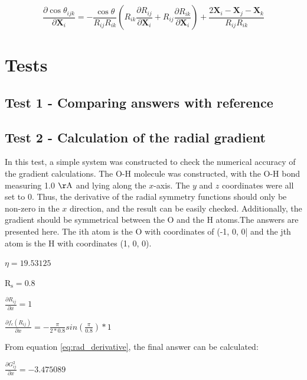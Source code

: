 \documentclass{article}
\newcommand{\mb}[1]{\mathbf{#1}}
\begin{document}
\begin{equation}
\frac{\partial \cos \theta_{ijk} } {\partial \mb{X}_i} = -\frac{\cos{\theta}  }{  R_{ij}  R_{ik} }  
\left( R_{ik} \frac{\partial R_{ij} } {\partial \mb{X}_i} + R_{ij} \frac{\partial R_{ik} } {\partial \mb{X}_i} \right) + \frac{ 2\mb{X}_i - \mb{X}_j - \mb{X}_k} { R_{ij} R_{ik} }
\end{equation}


\section{Tests}
\subsection{Test 1 - Comparing answers with reference}
\subsection{Test 2 - Calculation of the radial gradient}
In this test, a simple system was constructed to check the numerical accuracy of the gradient calculations. The O-H molecule was constructed, with the O-H bond measuring 1.0 $\mathrm{\AA}$ and lying along the $x$-axis. The $y$ and $z$ coordinates were all set to 0. Thus, the derivative of the radial symmetry functions should only be non-zero in the $x$ direction, and the result can be easily checked. Additionally, the gradient should be symmetrical between the O and the H atoms.The answers are presented here. The ith atom is the O with coordinates of (-1, 0, 0| and the jth atom is the H with coordinates (1, 0, 0).


$\eta = 19.53125$

$\mathrm{R_s} = 0.8$

$\frac{\partial R_{ij}}{\partial x} = 1$

$\frac{\partial f_c (R_{ij}) } { \partial x} = - \frac{\pi}{2 * 0.8} sin \left( \frac {\pi}{0.8} \right) * 1 $

From equation \eqref{eq:rad_derivative}, the final answer can be calculated:

$\frac{\partial G^2_{ij}}{\partial x} = -3.475089$
\end{document}
